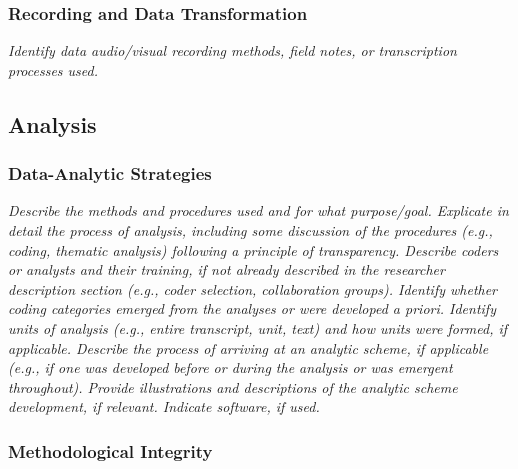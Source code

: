 \documentclass[acmsmall]{acmart}
\begin{document}
\subsubsection{Recording and Data Transformation}

{\em\small Identify data audio/visual recording methods, field notes, or transcription processes used.}

\subsection{Analysis}

\subsubsection{Data-Analytic Strategies}

{\em\small Describe the methods and procedures used and for what purpose/goal. Explicate in detail the process of analysis, including some discussion of the procedures (e.g., coding, thematic analysis) following a principle of transparency. Describe coders or analysts and their training, if not already described in the researcher
description section (e.g., coder selection, collaboration groups). Identify whether coding categories emerged from the analyses or were developed a priori. Identify units of analysis (e.g., entire transcript, unit, text) and how units were formed, if applicable. Describe the process of arriving at an analytic scheme, if applicable (e.g., if one was
developed before or during the analysis or was emergent throughout). Provide illustrations and descriptions of the analytic scheme development, if relevant. Indicate software, if used. }

\subsubsection{Methodological Integrity}
\end{document}
